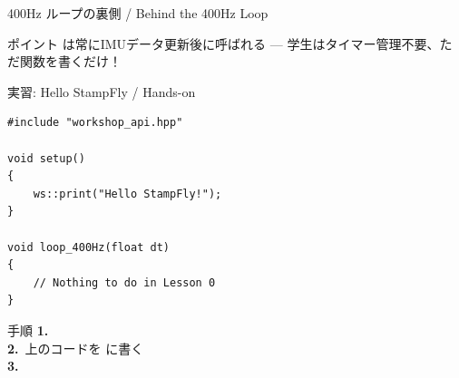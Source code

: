 \documentclass[aspectratio=169, 14pt]{beamer}
\begin{document}
\begin{frame}{400Hz ループの裏側 / Behind the 400Hz Loop}
  \begin{center}
    \vspace{-2mm}
    \resizebox{0.85\textwidth}{!}{}
  \end{center}

  \vspace{-0.5em}

  \begin{exampleblock}{ポイント}
     は常にIMUデータ更新後に呼ばれる
    --- 学生はタイマー管理不要、ただ関数を書くだけ！
  \end{exampleblock}
\end{frame}

\begin{frame}[fragile]{実習: Hello StampFly / Hands-on}
  \begin{lstlisting}[style=sfcpp, title={user\_code.cpp}]
#include "workshop_api.hpp"

void setup()
{
    ws::print("Hello StampFly!");
}

void loop_400Hz(float dt)
{
    // Nothing to do in Lesson 0
}
  \end{lstlisting}
  \vspace{-0.8em}
  \begin{exampleblock}{手順}\small
    \textbf{1.}~\\
    \textbf{2.}~上のコードを  に書く\\
    \textbf{3.}~
  \end{exampleblock}
\end{frame}
\end{document}
